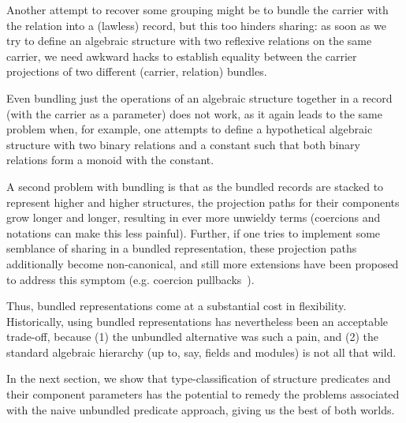 \documentclass[a4paper,10pt,runningheads]{llncs}
\begin{document}
Another attempt to recover some grouping might be to bundle the carrier with the relation into a (lawless) record, but this too hinders sharing: as soon as we try to define an algebraic structure with two reflexive relations on the same carrier, we need awkward hacks to establish equality between the carrier projections of two different (carrier, relation) bundles.

Even bundling just the operations of an algebraic structure together in a record (with the carrier as a parameter) does not work, as it again leads to the same problem when, for example, one attempts to define a hypothetical algebraic structure with two binary relations and a constant such that both binary relations form a monoid with the constant.

A second problem with bundling is that as the bundled records are stacked to represent higher and higher structures, the projection paths for their components grow longer and longer, resulting in ever more unwieldy terms (coercions and notations can make this less painful). Further, if one tries to implement some semblance of sharing in a bundled representation, these projection paths additionally become non-canonical, and still more extensions have been proposed to address this symptom (e.g. coercion pullbacks~\cite{Hints}).

Thus, bundled representations come at a substantial cost in flexibility. Historically, using bundled representations has nevertheless been an acceptable trade-off, because (1) the unbundled alternative was such a pain, and (2) the standard algebraic hierarchy (up to, say, fields and modules) is not all that wild.

In the next section, we show that type-classification of structure predicates and their component parameters has the potential to remedy the problems associated with the naive unbundled predicate approach, giving us the best of both worlds.


\end{document}

